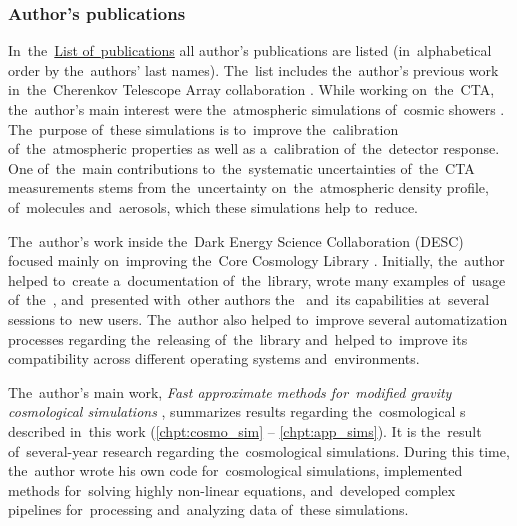 \subsubsection{Author's publications}
\begin{refsection}
In~the~\hyperref[chpt:list_publish]{List of~publications} all author's publications are listed (in~alphabetical order by the~authors' last names). The~list includes the~author's previous work in~the~Cherenkov Telescope Array collaboration \parencite{2016arXiv161005151C,2017arXiv170903483A,2017ApJ...840...74A,2019scta.book.....C}. While working on~the~CTA, the~author's main interest were the~atmospheric simulations of~cosmic showers \parencite{2017EPJWC.14401014V,}. The~purpose of~these simulations is to~improve the~calibration of~the~atmospheric properties as well as a~calibration of~the~detector response. One of~the~main contributions to~the~systematic uncertainties of~the~CTA measurements stems from the~uncertainty on~the~atmospheric density profile, of~molecules and~aerosols, which these simulations help to~reduce.

The~author's work inside the~Dark Energy Science Collaboration (DESC) focused mainly on~improving the~Core Cosmology Library \parencite[,][]{2019ascl.soft01003C,2019ApJS..242....2C}. Initially, the~author helped to~create a~documentation of~the~library, wrote many examples of~usage of~the~, and~presented with~other authors the~ and~its capabilities at~several sessions to~new users. The~author also helped to~improve several automatization processes regarding the~releasing of~the~library and~helped to~improve its compatibility across different operating systems and~environments.

The~author's main work, \textit{Fast approximate methods for~modified gravity cosmological simulations} \parencite[published in~Monthly Notices of~the~Royal Astronomical Society,][]{2020MNRAS.493.2085V}, summarizes results regarding the~cosmological \nbodysim s described in~this work (\autoref{chpt:cosmo_sim} -- \autoref{chpt:app_sims}). It is the~result of~several-year research regarding the~cosmological simulations. During this time, the~author wrote his own code for~cosmological simulations, implemented methods for~solving highly non-linear equations, and~developed complex pipelines for~processing and~analyzing data of~these simulations.
\end{refsection}
